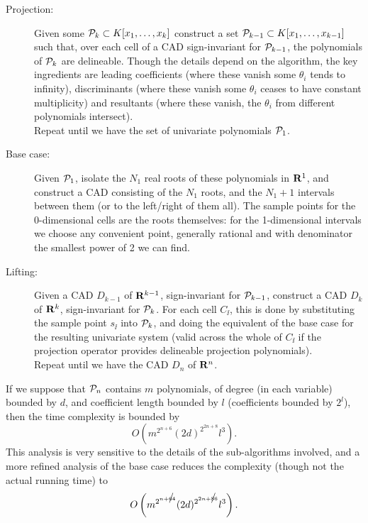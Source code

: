 \documentclass[runningheads,a4paper]{llncs}
\begin{document}
\begin{description}
\item[Projection:] Given some ${\cal P}_k\subset K[x_1,\ldots,x_k]$ construct a set ${\cal P}_{k-1}\subset K[x_1,\ldots,\allowbreak{}x_{k-1}]$ such that, over each cell of a CAD sign-invariant for ${\cal P}_{k-1}$, the polynomials of ${\cal P}_k$ are delineable. Though the details depend on the algorithm, the key ingredients are leading coefficients (where these vanish some $\theta_i$ tends to infinity), discriminants (where these vanish some $\theta_i$ ceases to have constant multiplicity)  and resultants (where these vanish, the $\theta_i$  from different polynomials intersect).  
\\
Repeat until we have the set of univariate polynomials ${\cal P}_1$.
\item[Base case:] Given ${\cal P}_1$, isolate the $N_1$ real roots of these polynomials in ${\mathbf R}^1$, and construct a CAD consisting of the $N_1$ roots, and the $N_1+1$ intervals between them (or to the left/right of them all). The sample points for the 0-dimensional cells are the roots themselves: for the 1-dimensional intervals we choose any convenient point, generally rational and with denominator the smallest power of 2 we can find.
\item[Lifting:] Given a CAD $D_{k-1}$ of ${\mathbf R}^{k-1}$, sign-invariant for ${\cal P}_{k-1}$, construct a CAD $D_{k}$ of ${\mathbf R}^{k}$, sign-invariant for ${\cal P}_{k}$. For each cell $C_\ii$, this is done by substituting the sample point $s_\ii$ into ${\cal P}_k$, and doing the equivalent of the base case for the resulting univariate system (valid across the whole of $C_\ii$ if the projection operator provides delineable projection polynomials).
\\
Repeat until we have the CAD $D_{n}$ of ${\mathbf R}^{n}$.
\end{description}
If we suppose that ${\cal P}_n$ contains $m$ polynomials, of degree (in each variable) bounded by $d$, and coefficient length bounded by $l$ (coefficients bounded by $2^l$), then the time  complexity is bounded  \cite[Theorem 16]{Collins1975} by
\begin{equation}\label{eq:Collins}
O\left(m^{2^{n+6}}(2d)^{2^{2n+8}}l^3\right).
\end{equation}\def\foo#1#2{\hbox to 0pt{/\hskip-6pt}#1{#2}}This analysis is very sensitive to the details of the sub-algorithms involved, and a more refined analysis of the base case \cite{Davenport1985c} reduces the complexity (though not the actual running time) to 
\[
O\left( m^{2^{n+\foo64}} (2d)^{2^{2n+\foo86}} l^3 \right).
\]
\end{document}
